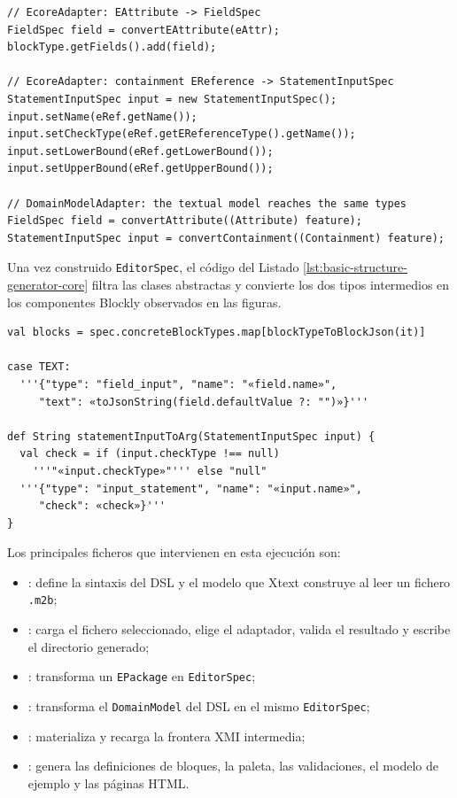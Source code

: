 \begin{lstlisting}[float=htbp, style=tfmjavaecore, caption={Núcleo de la normalización hacia \texttt{EditorSpec}}, label={lst:basic-structure-adapter-core}]
// EcoreAdapter: EAttribute -> FieldSpec
FieldSpec field = convertEAttribute(eAttr);
blockType.getFields().add(field);

// EcoreAdapter: containment EReference -> StatementInputSpec
StatementInputSpec input = new StatementInputSpec();
input.setName(eRef.getName());
input.setCheckType(eRef.getEReferenceType().getName());
input.setLowerBound(eRef.getLowerBound());
input.setUpperBound(eRef.getUpperBound());

// DomainModelAdapter: the textual model reaches the same types
FieldSpec field = convertAttribute((Attribute) feature);
StatementInputSpec input = convertContainment((Containment) feature);
\end{lstlisting}

Una vez construido \texttt{EditorSpec}, el código del Listado
\ref{lst:basic-structure-generator-core} filtra las clases abstractas y convierte
los dos tipos intermedios en los componentes Blockly observados en las figuras.

\begin{lstlisting}[float=htbp, style=tfmxtend, caption={Generación de bloques, campos y entradas de sentencias}, label={lst:basic-structure-generator-core}]
val blocks = spec.concreteBlockTypes.map[blockTypeToBlockJson(it)]

case TEXT:
  '''{"type": "field_input", "name": "«field.name»",
     "text": «toJsonString(field.defaultValue ?: "")»}'''

def String statementInputToArg(StatementInputSpec input) {
  val check = if (input.checkType !== null)
    '''"«input.checkType»"''' else "null"
  '''{"type": "input_statement", "name": "«input.name»",
     "check": «check»}'''
}
\end{lstlisting}

Los principales ficheros que intervienen en esta ejecución son:

\begin{itemize}
  \item {}: define la sintaxis del DSL y el modelo que
  Xtext construye al leer un fichero \texttt{.m2b};
  \item {}: carga el fichero seleccionado,
  elige el adaptador, valida el resultado y escribe el directorio generado;
  \item {}: transforma un \texttt{EPackage} en
  \texttt{EditorSpec};
  \item {}: transforma el \texttt{DomainModel} del
  DSL en el mismo \texttt{EditorSpec};
  \item {}: materializa y recarga la frontera
  XMI intermedia;
  \item {}: genera las definiciones de bloques,
  la paleta, las validaciones, el modelo de ejemplo y las páginas HTML.
\end{itemize}

